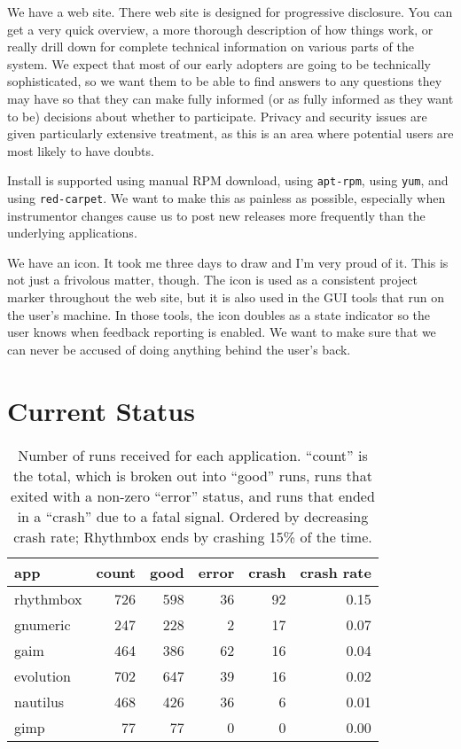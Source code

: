 \documentclass[times,10pt,twocolumn]{article}
\begin{document}
We have a web site.  There web site is designed for progressive
disclosure.  You can get a very quick overview, a more thorough
description of how things work, or really drill down for complete
technical information on various parts of the system.  We expect that
most of our early adopters are going to be technically sophisticated,
so we want them to be able to find answers to any questions they may
have so that they can make fully informed (or as fully informed as
they want to be) decisions about whether to participate.  Privacy and
security issues are given particularly extensive treatment, as this is
an area where potential users are most likely to have doubts.

Install is supported using manual RPM download, using
\texttt{apt-rpm}, using \texttt{yum}, and using \texttt{red-carpet}.
We want to make this as painless as possible, especially when
instrumentor changes cause us to post new releases more frequently
than the underlying applications.

We have an icon.  It took me three days to draw and I'm very proud of
it.  This is not just a frivolous matter, though.  The icon is used as
a consistent project marker throughout the web site, but it is also
used in the GUI tools that run on the user's machine.  In those tools,
the icon doubles as a state indicator so the user knows when feedback
reporting is enabled.  We want to make sure that we can never be
accused of doing anything behind the user's back.

\section{Current Status}

\begin{table}
  \begin{tabular}{lrrrrr}
    app & count & good & error & crash & crash rate \\ \hline
    rhythmbox & 726 & 598 & 36 & 92 & 0.15 \\
    gnumeric & 247 & 228 & 2 & 17 & 0.07 \\
    gaim & 464 & 386 & 62 & 16 & 0.04 \\
    evolution & 702 & 647 & 39 & 16 & 0.02 \\
    nautilus & 468 & 426 & 36 & 6 & 0.01 \\
    gimp & 77 & 77 & 0 & 0 & 0.00
  \end{tabular}
  \caption{Number of runs received for each application.  ``count'' is
    the total, which is broken out into ``good'' runs, runs that
    exited with a non-zero ``error'' status, and runs that ended in a
    ``crash'' due to a fatal signal.  Ordered by decreasing crash
    rate; Rhythmbox ends by crashing 15\% of the time.}
  \label{reports-per-app}
\end{table}
\end{document}
